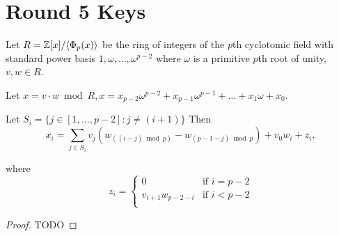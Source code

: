 \section{Round 5 Keys}
\label{sec:round-5-keys}

\begin{lemma}
\label{lem:mult-form}
Let $R=\mathbb{Z}[x]/\langle\Phi_{p}(x)\rangle$ be the ring of integers of the $p$th cyclotomic field with standard power basis $1,\omega,\ldots,\omega^{p-2}$ where $\omega$ is a primitive $p$th root of unity, $v, w \in R$.

Let $x=v \cdot w \bmod{R}, x=x_{p-2}\omega^{p-2}+x_{p-1}\omega^{p-1}+\ldots+x_{1}\omega+x_{0}$. 

Let $S_{i}=\{j \in [1,\ldots,p-2]: j \neq (i+1)\}$
Then 
\[x_{i}=\sum_{j \in S_{i}}v_{j}\left(w_{((i-j)\bmod{p})}-w_{(p-1-j)\bmod{p}}\right)+v_0w_{i}+z_{i},\]

where 
\[z_i=\begin{cases}0&\text{if }i=p-2\\
v_{i+1}w_{p-2-i}&\text{if }i<p-2\\\end{cases}\]
\end{lemma}

\begin{proof}
TODO
\end{proof}

